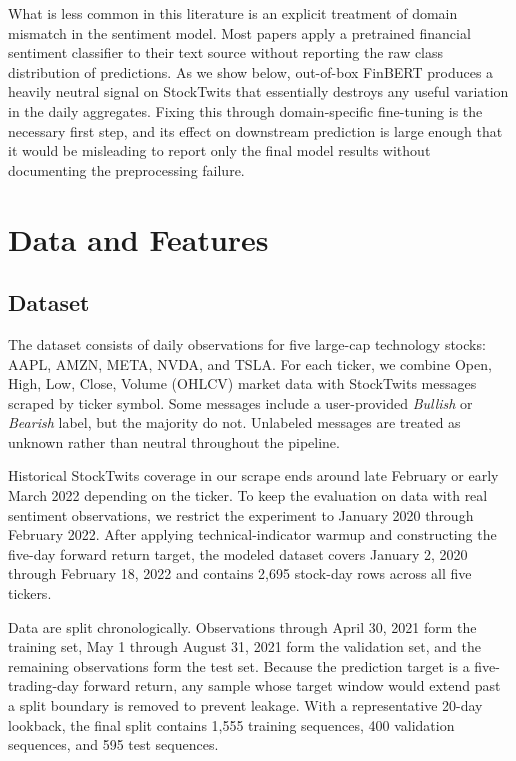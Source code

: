 \documentclass[10pt,twocolumn]{article}
\begin{document}
What is less common in this literature is an explicit treatment of domain mismatch in the sentiment model. Most papers apply a pretrained financial sentiment classifier to their text source without reporting the raw class distribution of predictions. As we show below, out-of-box FinBERT produces a heavily neutral signal on StockTwits that essentially destroys any useful variation in the daily aggregates. Fixing this through domain-specific fine-tuning is the necessary first step, and its effect on downstream prediction is large enough that it would be misleading to report only the final model results without documenting the preprocessing failure.

\section{Data and Features}
\label{sec:data}

\subsection{Dataset}

The dataset consists of daily observations for five large-cap technology stocks: AAPL, AMZN, META, NVDA, and TSLA. For each ticker, we combine Open, High, Low, Close, Volume (OHLCV) market data with StockTwits messages scraped by ticker symbol. Some messages include a user-provided \textit{Bullish} or \textit{Bearish} label, but the majority do not. Unlabeled messages are treated as unknown rather than neutral throughout the pipeline.

Historical StockTwits coverage in our scrape ends around late February or early March 2022 depending on the ticker. To keep the evaluation on data with real sentiment observations, we restrict the experiment to January 2020 through February 2022. After applying technical-indicator warmup and constructing the five-day forward return target, the modeled dataset covers January 2, 2020 through February 18, 2022 and contains 2,695 stock-day rows across all five tickers.

Data are split chronologically. Observations through April 30, 2021 form the training set, May 1 through August 31, 2021 form the validation set, and the remaining observations form the test set. Because the prediction target is a five-trading-day forward return, any sample whose target window would extend past a split boundary is removed to prevent leakage. With a representative 20-day lookback, the final split contains 1,555 training sequences, 400 validation sequences, and 595 test sequences.
\end{document}
